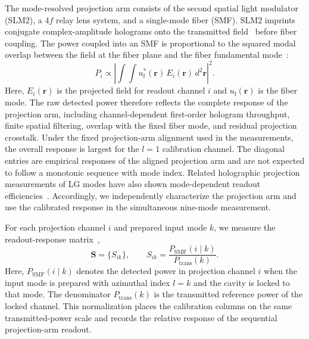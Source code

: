 \documentclass{optica-article}%
\begin{document}
The mode-resolved projection arm consists of the second spatial light modulator (SLM2), a $4f$ relay lens system, and a single-mode fiber (SMF). SLM2 imprints conjugate complex-amplitude holograms onto the transmitted field~\cite{Bolduc2013} before fiber coupling. The power coupled into an SMF is proportional to the squared modal overlap between the field at the fiber plane and the fiber fundamental mode~\cite{Shaklan1988}:
\begin{equation}
P_i \propto
\left|
\int\!\!\int u_{\mathrm{f}}^*(\mathbf{r})\,E_i(\mathbf{r})\,d^2\mathbf{r}
\right|^2 .
\label{eq:supp_smf_overlap}
\end{equation}
Here, $E_i(\mathbf{r})$ is the projected field for readout channel $i$ and $u_{\mathrm{f}}(\mathbf{r})$ is the fiber mode. The raw detected power therefore reflects the complete response of the projection arm, including channel-dependent first-order hologram throughput, finite spatial filtering, overlap with the fixed fiber mode, and residual projection crosstalk. Under the fixed projection-arm alignment used in the measurements, the overall response is largest for the $l=1$ calibration channel. The diagonal entries are empirical responses of the aligned projection arm and are not expected to follow a monotonic sequence with mode index. Related holographic projection measurements of LG modes have also shown mode-dependent readout efficiencies~\cite{Qassim2014,Bouchard2018}. Accordingly, we independently characterize the projection arm and use the calibrated response in the simultaneous nine-mode measurement.

For each projection channel $i$ and prepared input mode $k$, we measure the readout-response matrix~\cite{Carpenter2014},
\begin{equation}
\mathbf{S}=\{S_{ik}\},\qquad
S_{ik}=
\frac{P_{\mathrm{SMF}}(i\mid k)}
     {P_{\mathrm{trans}}(k)} .
\label{eq:supp_response_matrix}
\end{equation}
Here, $P_{\mathrm{SMF}}(i\mid k)$ denotes the detected power in projection channel $i$ when the input mode is prepared with azimuthal index $l=k$ and the cavity is locked to that mode. The denominator $P_{\mathrm{trans}}(k)$ is the transmitted reference power of the locked channel. This normalization places the calibration columns on the same transmitted-power scale and records the relative response of the sequential projection-arm readout.
\end{document}
